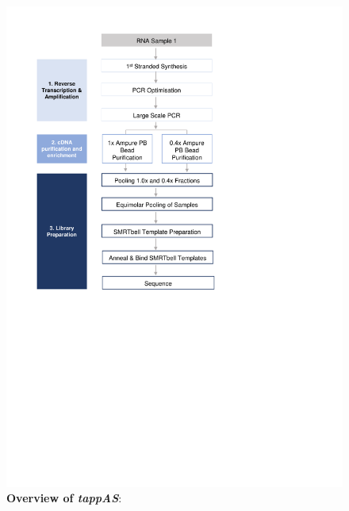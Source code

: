 \begin{figure}[htp]
	\begin{center}
		\includegraphics[page=21,trim={0cm 4cm 0 0cm},clip, scale = 0.8]{Figures/ProjectDevelopment_Figures.pdf}
	\end{center}
	\captionsetup{width=0.95\textwidth,singlelinecheck=off}
	\caption[Overview of \textit{tappAS}]%
	{\textbf{Overview of \textit{tappAS}}: 
	}
	\label{fig:tappAS_overview}
\end{figure}

\clearpage
